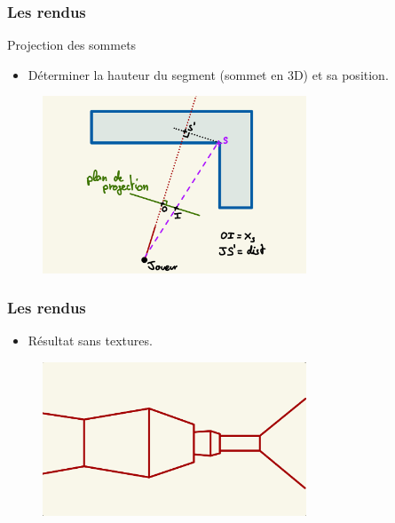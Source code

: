 \documentclass{beamer}
\begin{document}
\begin{frame}
    \frametitle{Les rendus}
    \begin{block}{Projection des sommets}
        \begin{itemize}
            \item Déterminer la hauteur du segment (sommet en 3D) et sa position.
        \end{itemize}
    \end{block}
    \begin{figure}
        \centering
        \includegraphics[width=0.7\textwidth]{images/shemaLanceRayon01.jpeg}
    \end{figure}
\end{frame}

\begin{frame}
    \frametitle{Les rendus}
    \begin{block}{}
        \begin{itemize}
            \item Résultat sans textures.
        \end{itemize}
    \end{block}
    \begin{figure}
        \centering
        \includegraphics[width=0.7\textwidth]{images/rendu-sans-texture.jpeg}
    \end{figure}
\end{frame}
\end{document}
